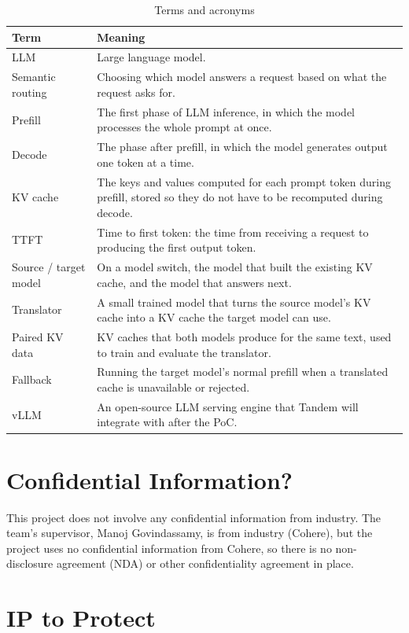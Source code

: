 \documentclass{article}
\begin{document}
\begin{table}[H]
\caption{Terms and acronyms} \label{TblTerms}
\begin{tabularx}{\textwidth}{lX}
\toprule
\textbf{Term} & \textbf{Meaning}\\
\midrule
LLM & Large language model.\\
Semantic routing & Choosing which model answers a request based on what
the request asks for.\\
Prefill & The first phase of LLM inference, in which the model processes
the whole prompt at once.\\
Decode & The phase after prefill, in which the model generates output one
token at a time.\\
KV cache & The keys and values computed for each prompt token during
prefill, stored so they do not have to be recomputed during decode.\\
TTFT & Time to first token: the time from receiving a request to producing
the first output token.\\
Source / target model & On a model switch, the model that built the
existing KV cache, and the model that answers next.\\
Translator & A small trained model that turns the source model's KV cache
into a KV cache the target model can use.\\
Paired KV data & KV caches that both models produce for the same text,
used to train and evaluate the translator.\\
Fallback & Running the target model's normal prefill when a translated
cache is unavailable or rejected.\\
vLLM & An open-source LLM serving engine that Tandem will integrate with
after the PoC.\\
\bottomrule
\end{tabularx}
\end{table}

\section{Confidential Information?}

This project does not involve any confidential information from industry.
The team's supervisor, Manoj Govindassamy, is from industry (Cohere), but
the project uses no confidential information from Cohere, so there is no
non-disclosure agreement (NDA) or other confidentiality agreement in place.

\section{IP to Protect}
\end{document}

